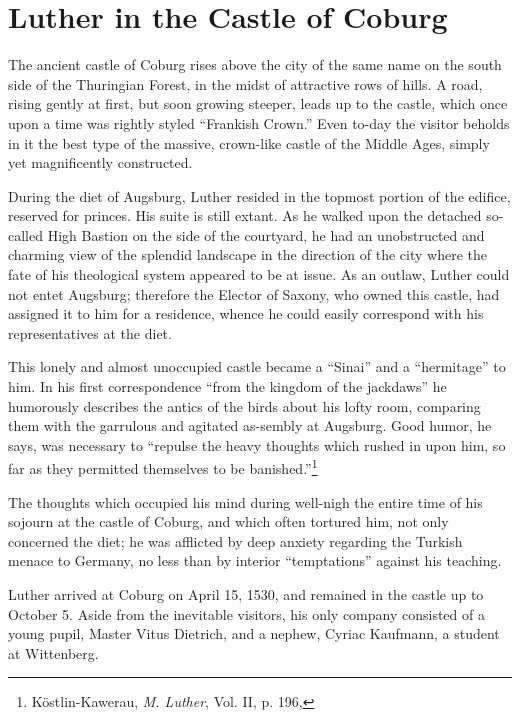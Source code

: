 \section{Luther in the Castle of Coburg}

The ancient castle of Coburg rises above the city of the same name
on the south side of the Thuringian Forest, in the midst of attractive
rows of hills. A road, rising gently at first, but soon growing steeper,
leads up to the castle, which once upon a time was rightly styled
“Frankish Crown.” Even to-day the visitor beholds in it the best type
of the massive, crown-like castle of the Middle Ages, simply yet magnificently
constructed.

During the diet of Augsburg, Luther resided in the topmost portion
of the edifice, reserved for princes. His suite is still extant. As he
walked upon the detached so-called High Bastion on the side of the
courtyard, he had an unobstructed and charming view of the splendid
landscape in the direction of the city where the fate of his theological
system appeared to be at issue. As an outlaw, Luther could not entet
Augsburg; therefore the Elector of Saxony, who owned this castle,
had assigned it to him for a residence, whence he could easily correspond
with his representatives at the diet.

This lonely and almost unoccupied castle became a “Sinai” and a
“hermitage” to him. In his first correspondence “from the kingdom
of the jackdaws” he humorously describes the antics of the birds about
his lofty room, comparing them with the garrulous and agitated as-sembly
at Augsburg. Good humor, he says, was necessary to “repulse the heavy
thoughts which rushed in upon him, so far as they
permitted themselves to be banished.”\footnote
{Köstlin-Kawerau, \textit{M. Luther}, Vol. II, p. 196,}

The thoughts which occupied his mind during well-nigh the entire
time of his sojourn at the castle of Coburg, and which often tortured
him, not only concerned the diet; he was afflicted by deep anxiety
regarding the Turkish menace to Germany, no less than by interior
“temptations” against his teaching.

Luther arrived at Coburg on April 15, 1530, and remained in the
castle up to October 5. Aside from the inevitable visitors, his only
company consisted of a young pupil, Master Vitus Dietrich, and a
nephew, Cyriac Kaufmann, a student at Wittenberg.

